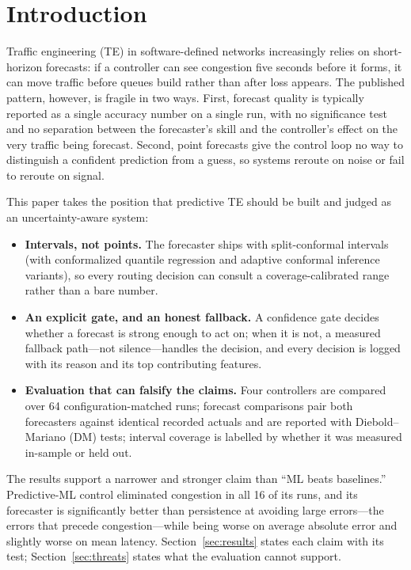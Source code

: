 \documentclass[conference]{IEEEtran}
\begin{document}
\section{Introduction}
Traffic engineering (TE) in software-defined networks increasingly
relies on short-horizon forecasts: if a controller can see congestion
five seconds before it forms, it can move traffic before queues build
rather than after loss appears. The published pattern, however, is
fragile in two ways. First, forecast quality is typically reported as
a single accuracy number on a single run, with no significance test
and no separation between the forecaster's skill and the controller's
effect on the very traffic being forecast. Second, point forecasts
give the control loop no way to distinguish a confident prediction
from a guess, so systems reroute on noise or fail to reroute on
signal.

This paper takes the position that predictive TE should be built and
judged as an uncertainty-aware system:

\begin{itemize}
\item \textbf{Intervals, not points.} The forecaster ships with
split-conformal intervals (with conformalized quantile regression and
adaptive conformal inference variants), so every routing decision can
consult a coverage-calibrated range rather than a bare number.
\item \textbf{An explicit gate, and an honest fallback.} A confidence
gate decides whether a forecast is strong enough to act on; when it
is not, a measured fallback path---not silence---handles the decision,
and every decision is logged with its reason and its top contributing
features.
\item \textbf{Evaluation that can falsify the claims.} Four
controllers are compared over 64 configuration-matched runs; forecast
comparisons pair both forecasters against identical recorded actuals
and are reported with Diebold--Mariano (DM) tests; interval coverage
is labelled by whether it was measured in-sample or held out.
\end{itemize}

The results support a narrower and stronger claim than ``ML beats
baselines.'' Predictive-ML control eliminated congestion in all 16 of
its runs, and its forecaster is significantly better than persistence
at avoiding large errors---the errors that precede congestion---while
being worse on average absolute error and slightly worse on mean
latency. Section~\ref{sec:results} states each claim with its test;
Section~\ref{sec:threats} states what the evaluation cannot support.
\end{document}
